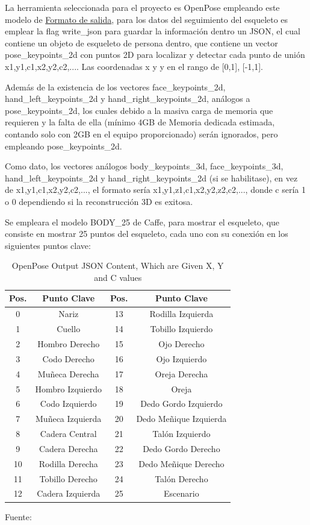 La herramienta seleccionada para el proyecto es OpenPose empleando este modelo de \href{https://github.com/CMU-Perceptual-Computing-Lab/openpose/blob/master/doc/output.md}{Formato de salida}, para los datos del seguimiento del esqueleto es emplear la flag write\_json para guardar la información dentro un JSON, el cual contiene un objeto de esqueleto de persona dentro, que contiene un vector pose\_keypoints\_2d con puntos 2D para localizar y detectar cada punto de unión x1,y1,c1,x2,y2,c2,.... Las coordenadas x y y en el rango de [0,1], [-1,1].

Además de la existencia de los vectores face\_keypoints\_2d, hand\_left\_keypoints\_2d y hand\_right\_keypoints\_2d, análogos a pose\_keypoints\_2d, los cuales debido a la masiva carga de memoria que requieren y la falta de ella (mínimo 4GB de Memoria dedicada estimada, contando solo con 2GB en el equipo proporcionado) serán ignorados, pero empleando pose\_keypoints\_2d.

Como dato, los vectores análogos body\_keypoints\_3d, face\_keypoints\_3d,
hand\_left\_keypoints\_2d y hand\_right\_keypoints\_2d (si se habilitase), en vez de 
x1,y1,c1,x2,y2,c2,..., el formato sería x1,y1,z1,c1,x2,y2,z2,c2,..., donde c sería 1 o 0 dependiendo si la reconstrucción 3D es exitosa.

Se empleara el modelo BODY\_25 de Caffe, para mostrar el esqueleto, que consiste en mostrar 25 puntos del esqueleto, cada uno con su conexión en los siguientes puntos clave:

\begin{table}[t]
	\begin{center}
		\begin{tabular}{| c | c | c | c | }
			\hline Pos. & Punto Clave & Pos. & Punto Clave \\ \hline
			0 & Nariz&13 & Rodilla Izquierda \\ \hline
			1 & Cuello &14 & Tobillo Izquierdo \\ \hline
			2 & Hombro Derecho& 15 & Ojo Derecho \\ \hline
			3 & Codo Derecho & 16 & Ojo Izquierdo \\ \hline
			4 & Muñeca Derecha & 17 & Oreja Derecha \\ \hline
			5 & Hombro Izquierdo & 18 & Oreja \\ \hline
			6 & Codo Izquierdo & 19 & Dedo Gordo Izquierdo \\ \hline
			7 & Muñeca Izquierda & 20 & Dedo Meñique Izquierda \\ \hline
			8 & Cadera Central & 21 & Talón Izquierdo \\ \hline
			9 & Cadera Derecha & 22 & Dedo Gordo Derecho \\ \hline
			10 & Rodilla Derecha & 23 & Dedo Meñique Derecho\\ \hline
			11 & Tobillo Derecho & 24 & Talón Derecho \\ \hline
			12 & Cadera Izquierda & 25 & Escenario \\ \hline
		\end{tabular}
		\caption{OpenPose Output JSON Content, Which are Given X, Y and C values}
		\footnotesize Fuente:\cite{8765346}
	\end{center}
\end{table}


